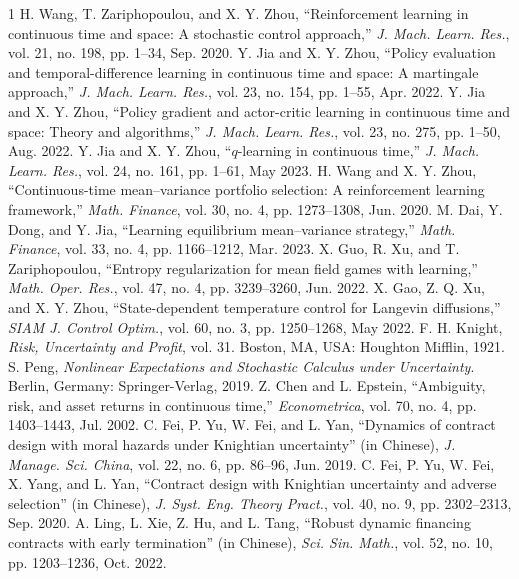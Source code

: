 \documentclass[onecolumn, journal]{IEEEtran} %
\begin{document}
\begin{thebibliography}{1}
		H. Wang, T. Zariphopoulou, and X. Y. Zhou, ``Reinforcement learning in continuous time and space: A stochastic control approach,'' \textit{J. Mach. Learn. Res.}, vol. 21, no. 198, pp. 1--34, Sep. 2020.
		Y. Jia and X. Y. Zhou, ``Policy evaluation and temporal-difference learning in continuous time and space: A martingale approach,'' \textit{J. Mach. Learn. Res.}, vol. 23, no. 154, pp. 1--55, Apr. 2022.
		Y. Jia and X. Y. Zhou, ``Policy gradient and actor-critic learning in continuous time and space: Theory and algorithms,'' \textit{J. Mach. Learn. Res.}, vol. 23, no. 275, pp. 1--50, Aug. 2022.
		Y. Jia and X. Y. Zhou, ``$q$-learning in continuous time,'' \textit{J. Mach. Learn. Res.}, vol. 24, no. 161, pp. 1--61, May 2023.
		H. Wang and X. Y. Zhou, ``Continuous-time mean--variance portfolio selection: A reinforcement learning framework,'' \textit{Math. Finance}, vol. 30, no. 4, pp. 1273--1308, Jun. 2020.
		M. Dai, Y. Dong, and Y. Jia, ``Learning equilibrium mean--variance strategy,'' \textit{Math. Finance}, vol. 33, no. 4, pp. 1166--1212, Mar. 2023.
		X. Guo, R. Xu, and T. Zariphopoulou, ``Entropy regularization for mean field games with learning,'' \textit{Math. Oper. Res.}, vol. 47, no. 4, pp. 3239--3260, Jun. 2022.
		X. Gao, Z. Q. Xu, and X. Y. Zhou, ``State-dependent temperature control for Langevin diffusions,'' \textit{SIAM J. Control Optim.}, vol. 60, no. 3, pp. 1250--1268, May 2022.
		F. H. Knight, \textit{Risk, Uncertainty and Profit}, vol. 31. Boston, MA, USA: Houghton Mifflin, 1921.
		S. Peng, \textit{Nonlinear Expectations and Stochastic Calculus under Uncertainty}. Berlin, Germany: Springer-Verlag, 2019.
		Z. Chen and L. Epstein, ``Ambiguity, risk, and asset returns in continuous time,'' \textit{Econometrica}, vol. 70, no. 4, pp. 1403--1443, Jul. 2002.
		C. Fei, P. Yu, W. Fei, and L. Yan, ``Dynamics of contract design with moral hazards under Knightian uncertainty'' (in Chinese), \textit{J. Manage. Sci. China}, vol. 22, no. 6, pp. 86--96, Jun. 2019.
		C. Fei, P. Yu, W. Fei, X. Yang, and L. Yan, ``Contract design with Knightian uncertainty and adverse selection'' (in Chinese), \textit{J. Syst. Eng. Theory Pract.}, vol. 40, no. 9, pp. 2302--2313, Sep. 2020.
		A. Ling, L. Xie, Z. Hu, and L. Tang, ``Robust dynamic financing contracts with early termination'' (in Chinese), \textit{Sci. Sin. Math.}, vol. 52, no. 10, pp. 1203--1236, Oct. 2022.

\end{thebibliography}
\end{document}
